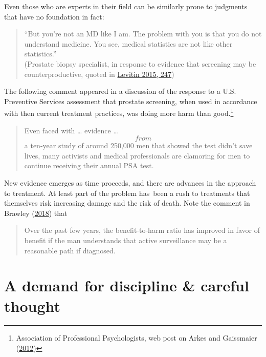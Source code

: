\documentclass[
  10pt,
  b5paper]{book}
\begin{document}
Even those who are experts in their field can be similarly prone to judgments that have no foundation in fact:

\begin{quote}
``But you're not an MD like I am. The problem with you is that you do not understand medicine. You see, medical statistics are not like other statistics.''\\
(Prostate biopsy specialist, in response to evidence that screening may be counterproductive, quoted in \protect\hyperlink{ref-levitin_2015}{Levitin 2015, 247})
\end{quote}

The following comment appeared in a discussion of the response to a U.S. Preventive Services assessment that prostate screening, when used in accordance with then current treatment practices, was doing more harm than good.\footnote{Association of Professional Psychologists, web post on Arkes and Gaissmaier (\protect\hyperlink{ref-arkes2012psychological}{2012})}

\begin{quote}
Even faced with \ldots{} evidence \ldots{} \[from\] a ten-year study of around 250,000 men that showed the test didn't save lives, many activists and medical professionals are clamoring for men to continue receiving their annual PSA test.
\end{quote}

New evidence emerges as time proceeds, and there are advances in the approach to treatment. At least part of the problem has~been a rush to treatments that themselves risk increasing damage and the risk of death. Note the comment in Brawley (\protect\hyperlink{ref-brawley2018prostate}{2018}) that

\begin{quote}
Over the past few years, the benefit‐to‐harm ratio has improved in favor of benefit if the man understands that active surveillance may be a reasonable path if diagnosed.
\end{quote}

\hypertarget{a-demand-for-discipline-careful-thought}{%
\section{A demand for discipline \& careful thought}\label{a-demand-for-discipline-careful-thought}}
\end{document}
